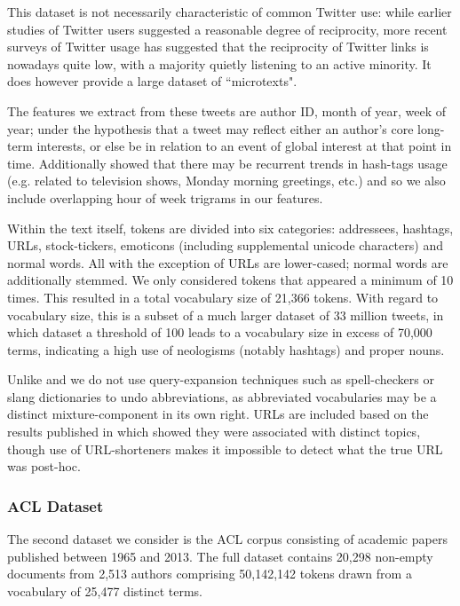 This dataset is not necessarily characteristic of common Twitter use: while earlier studies of Twitter users suggested a reasonable degree of reciprocity\cite{Java2007}, more recent surveys of Twitter usage has suggested that the reciprocity of Twitter links is nowadays quite low, with a majority quietly listening to an active minority\cite{Kwak2010}. It does however provide a large dataset of ``microtexts".

The features we extract from these tweets are author ID, month of year, week of year; under the hypothesis that a tweet may reflect either an author's core long-term interests, or else be in relation to an event of global interest at that point in time. Additionally \cite{Preot2012} showed that there may be recurrent trends in hash-tags usage (e.g. related to television shows, Monday morning greetings, etc.) and so we also include overlapping hour of week trigrams in our features. 


Within the text itself, tokens are divided into six categories: addressees, hashtags, URLs, stock-tickers, emoticons (including supplemental unicode characters) and normal words. All with the exception of URLs are lower-cased; normal words are additionally stemmed. We only considered tokens that appeared a minimum of 10 times. This resulted in a total vocabulary size of 21,366 tokens. With regard to vocabulary size, this is a subset of a much larger dataset of 33 million tweets, in which dataset a threshold of 100 leads to a vocabulary size in excess of 70,000 terms, indicating a high use of neologisms (notably hashtags) and proper nouns.

Unlike \cite{Wu2010} and \cite{Han2011} we do not use query-expansion techniques such as spell-checkers or slang dictionaries to undo abbreviations, as abbreviated vocabularies may be a distinct mixture-component in its own right. URLs are included based on the results published in \cite{Michelson2010} which showed they were associated with distinct topics, though use of URL-shorteners makes it impossible to detect what the true URL was post-hoc.

\subsubsection*{ACL Dataset}
The second dataset we consider is the ACL corpus consisting of academic papers published between 1965 and 2013. The full dataset contains 20,298 non-empty documents from 2,513 authors comprising 50,142,142 tokens drawn from a vocabulary of 25,477 distinct terms. 

